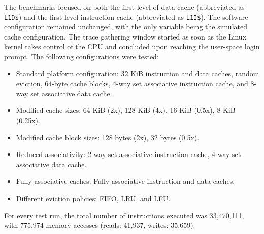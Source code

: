 The benchmarks focused on both the first level of data cache (abbreviated as \texttt{L1D\$}) and the first level instruction cache (abbreviated as \texttt{L1I\$}). The software
configuration remained unchanged, with the only variable being the simulated cache configuration. The trace gathering window started as soon as the Linux kernel takes
control of the CPU and concluded upon reaching the user-space login prompt. The following configurations were tested:

\begin{itemize}
    \item Standard platform configuration: 32 KiB instruction and data caches, random eviction, 64-byte cache blocks, 4-way set associative instruction cache, and 8-way set associative data cache.
    \item Modified cache sizes: 64 KiB (2x), 128 KiB (4x), 16 KiB (0.5x), 8 KiB (0.25x).
    \item Modified cache block sizes: 128 bytes (2x), 32 bytes (0.5x).
    \item Reduced associativity: 2-way set associative instruction cache, 4-way set associative data cache.
    \item Fully associative caches: Fully associative instruction and data caches.
	\item Different eviction policies: FIFO, LRU, and LFU.
\end{itemize}

\noindent For every test run, the total number of instructions executed was 33,470,111, with 775,974 memory accesses (reads: 41,937, writes: 35,659).

